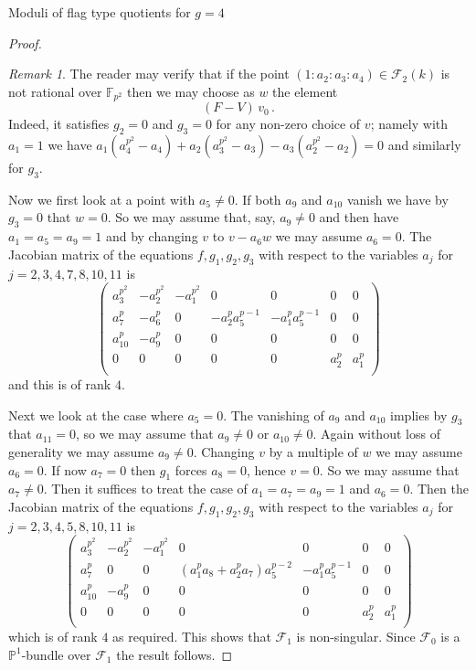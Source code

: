 \documentclass[11pt]{amsart}
\numberwithin{equation}{section}
\newcommand{\FF}{\mathbb F}
\newcommand{\PP}{\mathbb P}
\theoremstyle{definition}
\theoremstyle{remark}
\newtheorem{remark}[theorem]{Remark}
\begin{document}
\begin{section}{Moduli of flag type quotients for $g=4$}
\begin{proof}
\begin{remark}
The reader may verify that if the point $(1:a_2:a_3:a_4) \in \mathcal{F}_2(k)$
is not rational over ${\FF}_{p^2}$ then we may choose as $w$
the element 
$$
(F-V)\, v_0 \, .
$$
Indeed, it satisfies $g_2=0$ and $g_3=0$ 
for any non-zero choice of $v$; namely
with $a_1=1$ we have $a_1(a_4^{p^2}-a_4)+a_2(a_3^{p^2}-a_3)-a_3(a_2^{p^2}-a_2)=0$
and similarly for $g_3$. 
\end{remark}
Now we first look at a point with $a_5\neq 0$. If both $a_9$ and $a_{10}$ 
vanish we have by $g_3=0$ that $w=0$. So we may assume that, say, 
$a_9\neq 0$
and then have $a_1=a_5=a_9=1$ and by changing $v$ to $v-a_6w$ we may assume $a_6=0$. 
The Jacobian matrix of the
equations $f,g_1,g_2,g_3$ with respect to the variables $a_j$ for
$j=2,3,4,7,8,10,11$ is
$$
\left( \begin{matrix}
a_3^{p^2} & -a_2^{p^2} & -a_1^{p^2} & 0 & 0 & 0 & 0\\
a_7^p & -a_6^p & 0 & -a_2^pa_5^{p-1} & -a_1^pa_5^{p-1} & 0 & 0 \\
a_{10}^p & -a_9^p & 0 & 0 & 0 & 0 & 0 \\
0 & 0 & 0 & 0 & 0 &a_2^p & a_1^p \\
\end{matrix}
\right)
$$
and this is of rank $4$. 

Next we look at the case where $a_5=0$. The vanishing of $a_9$ and $a_{10}$
implies by $g_3$ that $a_{11}=0$, so we may assume that $a_9\neq 0$ or 
$a_{10}\neq 0$. Again without loss of generality we may assume $a_9\neq 0$.
Changing $v$ by a multiple of $w$ we may assume $a_6=0$. If now $a_7=0$
then $g_1$ forces $a_8=0$, hence $v=0$. So we may assume that $a_7\neq 0$.
Then it suffices to treat the case of $a_1=a_7=a_9=1$ and $a_6=0$. Then the Jacobian matrix of the
equations $f,g_1,g_2,g_3$ with respect to the variables $a_j$ for
$j=2,3,4,5,8,10,11$ is
$$
\left( \begin{matrix}
a_3^{p^2} & - a_2^{p^2} & -a_1^{p^2} & 0  & 0 & 0 & 0 \\
a_7^p & 0 & 0 & (a_1^pa_8+a_2^pa_7)a_5^{p-2} & -a_1^pa_5^{p-1} & 0 & 0 \\
a_{10}^p & -a_9^p & 0 & 0 & 0 & 0 & 0 \\
0 & 0 & 0 & 0 & 0 & a_2^p & a_1^p \\
\end{matrix}
\right)
$$
which is of rank $4$ as required. This shows that
$\mathcal{F}_1$ is non-singular. Since $\mathcal{F}_0$ is a ${\PP}^1$-bundle
over $\mathcal{F}_1$ the result follows.
\end{proof}


\end{section}
\end{document}
